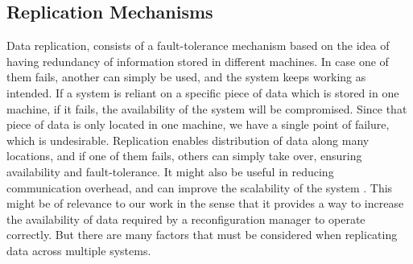 \subsection{Replication Mechanisms}
\label{ssec:replication_mechanisms}
\par Data replication, consists of a fault-tolerance mechanism based on the idea of having redundancy of information stored in different machines. In case one of them fails, another can simply be used, and the system keeps working as intended. If a system is reliant on a specific piece of data which is stored in one machine, if it fails, the availability of the system will be compromised. Since that piece of data is only located in one machine, we have a single point of failure, which is undesirable. Replication enables distribution of data along many locations, and if one of them fails, others can simply take over, ensuring availability and fault-tolerance. 
It might also be useful in reducing communication overhead, and can improve the scalability of the system \cite{Martins2006}. This might be of relevance to our work in the sense that it provides a way to increase the availability of data required by a reconfiguration manager to operate correctly. But there are many factors that must be considered when replicating data across multiple systems.
%
%
%
